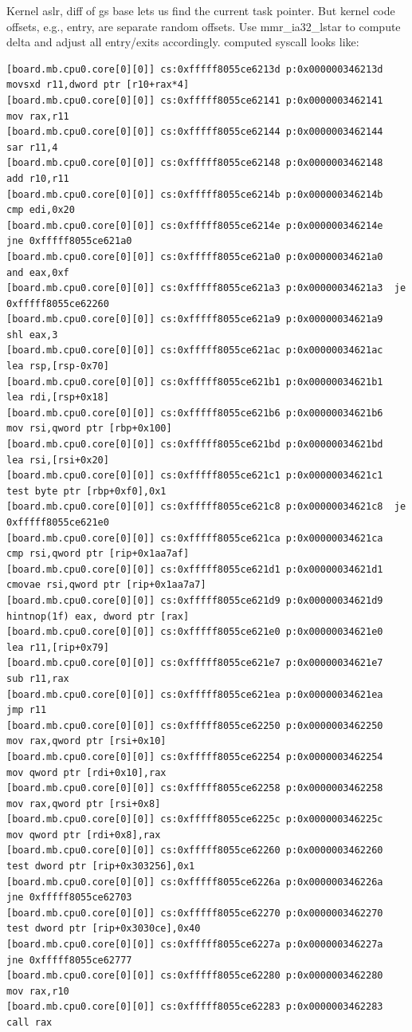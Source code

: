 \documentclass[titlepage]{article}
\begin{document}
\begin{appendices}
Kernel aslr, diff of gs base lets us find the current task pointer.  But kernel code offsets, e.g., entry,
are separate random offsets.  Use mmr\_ia32\_lstar to compute delta and adjust all entry/exits accordingly.
computed syscall looks like:
\begin{verbatim}
[board.mb.cpu0.core[0][0]] cs:0xfffff8055ce6213d p:0x000000346213d  movsxd r11,dword ptr [r10+rax*4]
[board.mb.cpu0.core[0][0]] cs:0xfffff8055ce62141 p:0x0000003462141  mov rax,r11
[board.mb.cpu0.core[0][0]] cs:0xfffff8055ce62144 p:0x0000003462144  sar r11,4
[board.mb.cpu0.core[0][0]] cs:0xfffff8055ce62148 p:0x0000003462148  add r10,r11
[board.mb.cpu0.core[0][0]] cs:0xfffff8055ce6214b p:0x000000346214b  cmp edi,0x20
[board.mb.cpu0.core[0][0]] cs:0xfffff8055ce6214e p:0x000000346214e  jne 0xfffff8055ce621a0
[board.mb.cpu0.core[0][0]] cs:0xfffff8055ce621a0 p:0x00000034621a0  and eax,0xf
[board.mb.cpu0.core[0][0]] cs:0xfffff8055ce621a3 p:0x00000034621a3  je 0xfffff8055ce62260
[board.mb.cpu0.core[0][0]] cs:0xfffff8055ce621a9 p:0x00000034621a9  shl eax,3
[board.mb.cpu0.core[0][0]] cs:0xfffff8055ce621ac p:0x00000034621ac  lea rsp,[rsp-0x70]
[board.mb.cpu0.core[0][0]] cs:0xfffff8055ce621b1 p:0x00000034621b1  lea rdi,[rsp+0x18]
[board.mb.cpu0.core[0][0]] cs:0xfffff8055ce621b6 p:0x00000034621b6  mov rsi,qword ptr [rbp+0x100]
[board.mb.cpu0.core[0][0]] cs:0xfffff8055ce621bd p:0x00000034621bd  lea rsi,[rsi+0x20]
[board.mb.cpu0.core[0][0]] cs:0xfffff8055ce621c1 p:0x00000034621c1  test byte ptr [rbp+0xf0],0x1
[board.mb.cpu0.core[0][0]] cs:0xfffff8055ce621c8 p:0x00000034621c8  je 0xfffff8055ce621e0
[board.mb.cpu0.core[0][0]] cs:0xfffff8055ce621ca p:0x00000034621ca  cmp rsi,qword ptr [rip+0x1aa7af]
[board.mb.cpu0.core[0][0]] cs:0xfffff8055ce621d1 p:0x00000034621d1  cmovae rsi,qword ptr [rip+0x1aa7a7]
[board.mb.cpu0.core[0][0]] cs:0xfffff8055ce621d9 p:0x00000034621d9  hintnop(1f) eax, dword ptr [rax]
[board.mb.cpu0.core[0][0]] cs:0xfffff8055ce621e0 p:0x00000034621e0  lea r11,[rip+0x79]
[board.mb.cpu0.core[0][0]] cs:0xfffff8055ce621e7 p:0x00000034621e7  sub r11,rax
[board.mb.cpu0.core[0][0]] cs:0xfffff8055ce621ea p:0x00000034621ea  jmp r11
[board.mb.cpu0.core[0][0]] cs:0xfffff8055ce62250 p:0x0000003462250  mov rax,qword ptr [rsi+0x10]
[board.mb.cpu0.core[0][0]] cs:0xfffff8055ce62254 p:0x0000003462254  mov qword ptr [rdi+0x10],rax
[board.mb.cpu0.core[0][0]] cs:0xfffff8055ce62258 p:0x0000003462258  mov rax,qword ptr [rsi+0x8]
[board.mb.cpu0.core[0][0]] cs:0xfffff8055ce6225c p:0x000000346225c  mov qword ptr [rdi+0x8],rax
[board.mb.cpu0.core[0][0]] cs:0xfffff8055ce62260 p:0x0000003462260  test dword ptr [rip+0x303256],0x1
[board.mb.cpu0.core[0][0]] cs:0xfffff8055ce6226a p:0x000000346226a  jne 0xfffff8055ce62703
[board.mb.cpu0.core[0][0]] cs:0xfffff8055ce62270 p:0x0000003462270  test dword ptr [rip+0x3030ce],0x40
[board.mb.cpu0.core[0][0]] cs:0xfffff8055ce6227a p:0x000000346227a  jne 0xfffff8055ce62777
[board.mb.cpu0.core[0][0]] cs:0xfffff8055ce62280 p:0x0000003462280  mov rax,r10
[board.mb.cpu0.core[0][0]] cs:0xfffff8055ce62283 p:0x0000003462283  call rax


\end{verbatim}
\end{appendices}
\end{document}
